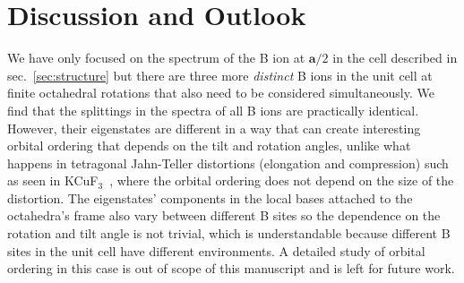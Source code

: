 \documentclass[a4paper,prb,twocolumn]{revtex4-1}  %
\newcommand{\com}[1]{}
\begin{document}
\section{Discussion and Outlook}
\label{sec:discussion}


\com{
Based on our analysis of A and B cages,
we expect that,
in case of atomic scale perovskite superlattices
with cations having different charges in alternating layers,
the crystal field at B sites will bear the exact same deformation as in case of 
a tetragonal distortion of the octahedra,
and should lead to 
a JT like splitting even 
in the symmetric structure, i.e., with no structural distortion.
Considering the charge as a dynamic variable,
it should then also be possible that in 
simple perovskites structure,
the system might encounter charge instabilities similar to the structural ones,
where the system is stabilised by a charge transfer from one site to another
that lowers the electronic energy and costs 
the ``elastic'' energy proportional to the chemical hardness of the ions involved.
Such considerations might be useful in studying polaron formation and dynamics.
}



We have only focused on the spectrum of 
the B ion at 
$\textbf{a}/2$
 in the cell 
described in sec.~\ref{sec:structure}
but 
there are three more \emph{distinct} B ions in the unit cell 
at finite octahedral rotations that also 
need to be considered simultaneously.
We find that the splittings in the spectra
of all B ions are
practically identical.
However, their eigenstates 
are different in a way that can
create interesting orbital ordering
that depends on the tilt and rotation angles,
unlike what happens in 
tetragonal Jahn-Teller distortions (elongation and compression) 
such as seen in KCuF$_3$~\cite{LiechtensteinPRB95}, 
where the orbital ordering does not depend on the size of the distortion.
The eigenstates' components in the local bases attached to the octahedra's frame
also vary between different B sites 
so the dependence on the rotation and tilt angle is not trivial,
which is understandable because different B sites in the unit cell have different environments. 
A detailed study of orbital ordering in this case is out of scope of this manuscript and is left for future work.
\end{document}
